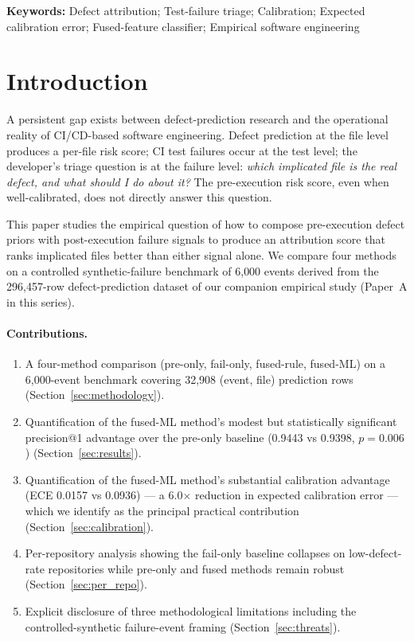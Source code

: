 \documentclass[11pt,a4paper]{article}
\begin{document}
\noindent\textbf{Keywords:} Defect attribution; Test-failure triage; Calibration; Expected calibration error; Fused-feature classifier; Empirical software engineering








\section{Introduction}
\label{sec:intro}
\FloatBarrier

A persistent gap exists between defect-prediction research and the
operational reality of CI/CD-based software engineering. Defect
prediction at the file level produces a per-file risk score; CI
test failures occur at the test level; the developer's triage
question is at the failure level: \emph{which implicated file is the
real defect, and what should I do about it?} The pre-execution risk
score, even when well-calibrated, does not directly answer this
question.

This paper studies the empirical question of how to compose
pre-execution defect priors with post-execution failure signals to
produce an attribution score that ranks implicated files better than
either signal alone. We compare four methods on a controlled
synthetic-failure benchmark of 6{,}000 events derived from the
296{,}457-row defect-prediction dataset of our companion empirical
study (Paper~A in this series).

\paragraph{Contributions.}

\begin{enumerate}
  \item A four-method comparison (pre-only, fail-only, fused-rule,
        fused-ML) on a 6{,}000-event benchmark covering 32{,}908
        (event, file) prediction rows
        (Section~\ref{sec:methodology}).
  \item Quantification of the fused-ML method's modest but
        statistically significant precision@1 advantage over the
        pre-only baseline (0.9443 vs 0.9398, $p = 0.006$)
        (Section~\ref{sec:results}).
  \item Quantification of the fused-ML method's substantial
        calibration advantage (ECE 0.0157 vs 0.0936) ---
        a 6.0$\times$ reduction in expected calibration error ---
        which we identify as the principal practical contribution
        (Section~\ref{sec:calibration}).
  \item Per-repository analysis showing the fail-only baseline
        collapses on low-defect-rate repositories while pre-only and
        fused methods remain robust (Section~\ref{sec:per_repo}).
  \item Explicit disclosure of three methodological limitations
        including the controlled-synthetic failure-event framing
        (Section~\ref{sec:threats}).
\end{enumerate}
\end{document}

